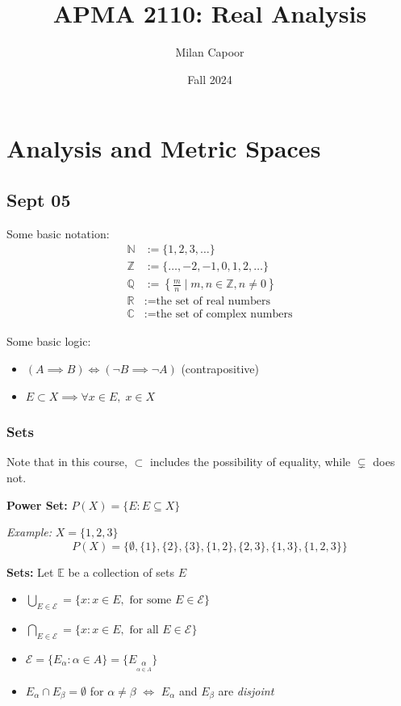 \documentclass[12pt]{report}
\title{APMA 2110: Real Analysis}
\author{Milan Capoor}
\date{Fall 2024}
\newcommand{\R}{\mathbb{R}}
\newcommand{\E}{\mathbb{E}}
\newcommand{\Z}{\mathbb{Z}}
\newcommand{\N}{\mathbb{N}}
\newcommand{\Q}{\mathbb{Q}}
\newcommand{\C}{\mathbb{C}}
\newcommand{\Ec}{\mathcal{E}}
\newcommand{\sub}{\subseteq}
\begin{document}
\maketitle
\chapter{Analysis and Metric Spaces}
\section*{Sept 05}
Some basic notation:
\begin{align*}
    \N &:= \{1, 2, 3, \ldots\} \\
    \Z &:= \{\ldots, -2, -1, 0, 1, 2, \ldots\} \\
    \Q &:= \left\{\frac{m}{n} \mid m, n \in \Z, n \neq 0\right\} \\
    \R &:= \text{the set of real numbers}\\
    \C &:= \text{the set of complex numbers}     
\end{align*}

Some basic logic:
\begin{itemize}
    \item $(A \implies B) \iff (\neg B \implies \neg A)$ (contrapositive)
    \item $E \subset X \implies \forall x \in E, \; x \in X$
\end{itemize}

    \subsection*{Sets}
    Note that in this course, $\subset$ includes the possibility of equality, while $\subsetneq$ does not.

    \textbf{Power Set:} $P(X) = \{E: E \sub X\}$

    \emph{Example:} $X = \{1, 2, 3\}$ 
    \[P(X) = \{\emptyset, \{1\}, \{2\}, \{3\}, \{1, 2\}, \{2, 3\}, \{1, 3\}, \{1, 2, 3\}\}\]

    \textbf{Sets:} Let $\E$ be a collection of sets $E$
    \begin{itemize}
        \item $\bigcup_{E \in \Ec} = \{x : x\in E, \text{ for some } E \in \Ec\}$
        \item $\bigcap_{E \in \Ec} = \{x : x\in E, \text{ for all } E \in \Ec\}$
        \item $\Ec = \{E_{\alpha} : \alpha \in A\} = \{E_{\underset{\alpha \in A}{\alpha}}\}$ 
        \item $E_{\alpha} \cap E_{\beta} = \emptyset$ for $\alpha \neq \beta$ $\iff$ $E_{\alpha}$ and $E_{\beta}$ are \emph{disjoint}
    \end{itemize}
\end{document}
